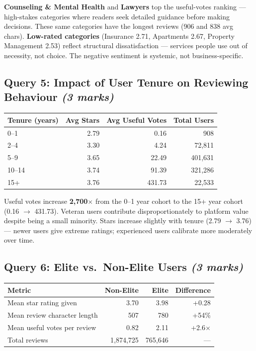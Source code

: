 \documentclass[12pt,a4paper]{article}
\newcommand{\marks}[1]{\hfill\textit{(#1 marks)}}
\begin{document}
\textbf{Counseling \& Mental Health} and \textbf{Lawyers} top the useful-votes
ranking --- high-stakes categories where readers seek detailed guidance before
making decisions. These same categories have the longest reviews (906 and 838
avg chars). \textbf{Low-rated categories} (Insurance 2.71, Apartments 2.67,
Property Management 2.53) reflect structural dissatisfaction --- services
people use out of necessity, not choice. The negative sentiment is systemic,
not business-specific.

\subsection{Query 5: Impact of User Tenure on Reviewing Behaviour \marks{3}}

\begin{table}[H]
  \centering
  \begin{tabular}{lrrr}
    \toprule
    \textbf{Tenure (years)} & \textbf{Avg Stars} & \textbf{Avg Useful Votes} & \textbf{Total Users} \\
    \midrule
    0--1  & 2.79 & 0.16   &    908 \\
    2--4  & 3.30 & 4.24   & 72,811 \\
    5--9  & 3.65 & 22.49  & 401,631 \\
    10--14 & 3.74 & 91.39 & 321,286 \\
    15+   & 3.76 & 431.73 &  22,533 \\
    \bottomrule
  \end{tabular}
\end{table}

Useful votes increase \textbf{2,700$\times$} from the 0--1 year cohort to the
15+ year cohort (0.16 $\to$ 431.73). Veteran users contribute
disproportionately to platform value despite being a small minority. Stars
increase slightly with tenure (2.79 $\to$ 3.76) --- newer users give extreme
ratings; experienced users calibrate more moderately over time.

\subsection{Query 6: Elite vs.\ Non-Elite Users \marks{3}}

\begin{table}[H]
  \centering
  \begin{tabular}{lrrr}
    \toprule
    \textbf{Metric} & \textbf{Non-Elite} & \textbf{Elite} & \textbf{Difference} \\
    \midrule
    Mean star rating given          & 3.70 & 3.98 & +0.28 \\
    Mean review character length    & 507  & 780  & +54\% \\
    Mean useful votes per review    & 0.82 & 2.11 & +2.6$\times$ \\
    Total reviews                   & 1,874,725 & 765,646 & --- \\
    \bottomrule
  \end{tabular}
\end{table}
\end{document}
